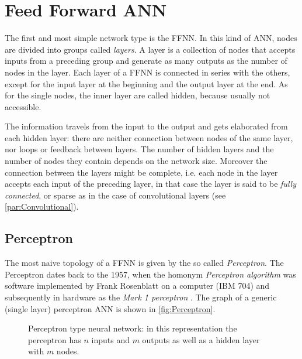 \section{Feed Forward ANN}
\label{sec:Feed_Forward_ANN}

The first and most simple network type is the \ac{FFNN}.
In this kind of \acs{ANN}, nodes are divided into groups called \textit{layers}.
A layer is a collection of nodes that accepts inputs from a preceding group and generate as many outputs as the number of nodes in the layer.
Each layer of a \acs{FFNN} is connected in series with the others, except for the input layer at the beginning and the output layer at the end.
As for the single nodes, the inner layer are called hidden, because usually not accessible.

The information travels from the input to the output and gets elaborated from each hidden layer: there are neither connection between nodes of the same layer, nor loops or feedback between layers.
The number of hidden layers and the number of nodes they contain depends on the network size.
Moreover the connection between the layers might be complete, i.e. each node in the layer accepts each input of the preceding layer, in that case the layer is said to be \textit{fully connected}, or sparse as in the case of convolutional layers (see \autoref{par:Convolutional}).

\subsection{Perceptron}
\label{ssec:Perceptron}

The most naive topology of a \acs{FFNN} is given by the so called \textit{Perceptron}.
The Perceptron dates back to the 1957, when the homonym \textit{Perceptron algorithm} was software implemented by Frank Rosenblatt on a computer (IBM 704) and subsequently in hardware as the \textit{Mark 1 perceptron} \cite{frank1957perceptron,Rosenblatt1958}.
The graph of a generic (single layer) perceptron \acs{ANN} is shown in \autoref{fig:Perceptron}.

\begin{figure}[ht]
	\centering
	
	\caption{%
		Perceptron type neural network: in this representation the perceptron has $n$ inputs and $m$ outputs as well as a hidden layer with $m$ nodes. %
		}
	\label{fig:Perceptron}
\end{figure}

